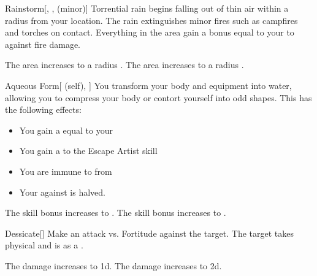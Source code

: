 \lowercase{\hypertarget{spell:Rainstorm}{}}\label{spell:Rainstorm}
\begin{freeability}[Rank 3]{\hypertarget{spell:Rainstorm}{Rainstorm}}[, ,  (minor)]
Torrential rain begins falling out of thin air within a \arealarge radius  from your location.
The rain extinguishes minor fires such as campfires and torches on contact.
Everything in the area gain a bonus equal to your  to  against fire damage.

\rankline
{} The area increases to a \areahuge radius .
 The area increases to a \areaext radius .
\end{freeability}
\vspace{0.25em}



\lowercase{\hypertarget{spell:Aqueous Form}{}}\label{spell:Aqueous Form}
\begin{attuneability}[Rank 4]{\hypertarget{spell:Aqueous Form}{Aqueous Form}}[ (self), ]
You transform your body and equipment into water, allowing you to compress your body or contort yourself into odd shapes.
This has the following effects:
\begin{itemize}
\item You gain a  equal to your 
\item You gain a   to the Escape Artist skill
\item You are immune to  from 
\item Your  against  is halved.
\end{itemize}

\rankline
{} The skill bonus increases to .
 The skill bonus increases to .
\end{attuneability}
\vspace{0.25em}



\lowercase{\hypertarget{spell:Dessicate}{}}\label{spell:Dessicate}
\begin{freeability}[Rank 4]{\hypertarget{spell:Dessicate}{Dessicate}}[]
Make an attack vs. Fortitude against the target.
\hit The target takes physical  and is  as a .

\rankline
{} The damage increases to  \plus1d.
 The damage increases to  \plus2d.
\end{freeability}
\vspace{0.25em}



